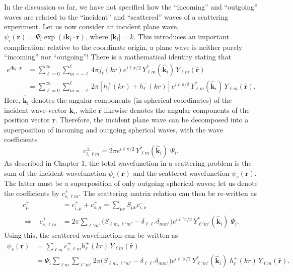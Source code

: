 \documentclass[pra,12pt]{revtex4}
\begin{document}
In the discussion so far, we have not specified how the ``incoming''
and ``outgoing'' waves are related to the ``incident'' and
``scattered'' waves of a scattering experiment.  Let us now consider
an incident plane wave, $\psi_i(\mathbf{r}) = \Psi_i
\exp(i\mathbf{k}_i\cdot \mathbf{r})$, where $|\mathbf{k}_i| = k$.
This introduces an important complication: relative to the coordinate
origin, a plane wave is neither purely ``incoming'' nor ``outgoing''!
There is a mathematical identity stating that
$$\begin{aligned}e^{i\mathbf{k}_i \cdot \mathbf{r}} &= \sum_{\ell=0}^\infty \sum_{m=-\ell}^\ell 4 \pi j_{\ell}(kr) e^{i\ell\pi/2} \, Y_{\ell m}^*(\hat{\mathbf{k}}_i) \, Y_{\ell m}(\hat{\mathbf{r}})\\ &= \sum_{\ell=0}^\infty \sum_{m=-\ell}^\ell 2 \pi \left[h_{\ell}^+(kr) + h_{\ell}^-(kr)\right] e^{i\ell\pi/2} \, Y_{\ell m}^*(\hat{\mathbf{k}}_i) \, Y_{\ell m}(\hat{\mathbf{r}}).\end{aligned}$$
Here, $\hat{\mathbf{k}}_i$ denotes the angular components (in
spherical coordinates) of the incident wave-vector $\mathbf{k}_i$,
while $\hat{\mathbf{r}}$ likewise denotes the angular components of
the position vector $\mathbf{r}$.  Therefore, the incident plane wave
can be decomposed into a superposition of incoming and outgoing
spherical waves, with the wave coefficients
$$c^{\pm}_{i, \ell m} = 2 \pi e^{i\ell\pi/2} \, Y_{\ell m}^*(\hat{\mathbf{k}}_i)\; \Psi_i.$$
As described in Chapter 1, the total wavefunction in a scattering
problem is the sum of the incident wavefunction $\psi_i(\mathbf{r})$
and the scattered wavefunction $\psi_s(\mathbf{r})$.  The latter must
be a superposition of only outgoing spherical waves; let us denote the
coefficients by $c^+_{s,\ell m}$.  The scattering matrix relation can
then be re-written as
$$\begin{aligned}c^+_\mu &= c^+_{i,\mu} + c^+_{s,\mu} = \sum_{\mu\nu} S_{\mu\nu} c^-_{i,\nu} \\ \Rightarrow \;\;\; c^+_{s,\ell m} &= 2 \pi \sum_{\ell' m'} \Big(S_{\ell m, \ell' m'} - \delta_{\ell \ell'}\delta_{mm'}\Big) e^{i\ell'\pi/2} \, Y_{\ell' m'}^*(\hat{\mathbf{k}}_i)\; \Psi_i. \end{aligned}$$
Using this, the scattered wavefunction can be written as
$$\begin{aligned}\psi_s(\mathbf{r}) &= \sum_{\ell m} c^+_{s,\ell m} h_{\ell}^+(kr) \, Y_{\ell m}(\hat{\mathbf{r}}) \\ &= \Psi_i \sum_{\ell m} \sum_{\ell' m'} 2 \pi \Big(S_{\ell m, \ell' m'} - \delta_{\ell \ell'}\delta_{mm'}\Big) e^{i\ell'\pi/2} \, Y_{\ell' m'}^*(\hat{\mathbf{k}}_i)\; h_{\ell}^+(kr) \, Y_{\ell m}(\hat{\mathbf{r}}).\end{aligned}$$
\end{document}
